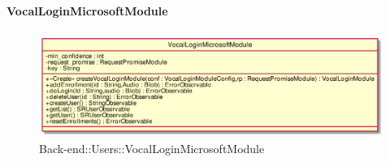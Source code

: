 \hypertarget{VocalLoginMicrosoftModule_label}{\paragraph{VocalLoginMicrosoftModule}}
\begin{figure}[h]
	\centering
	\includegraphics[width=\textwidth,height=\textheight,keepaspectratio]{images/ClassVocalLoginMicrosoftModule.png}
	\caption{Back-end::Users::VocalLoginMicrosoftModule}
\end{figure}

